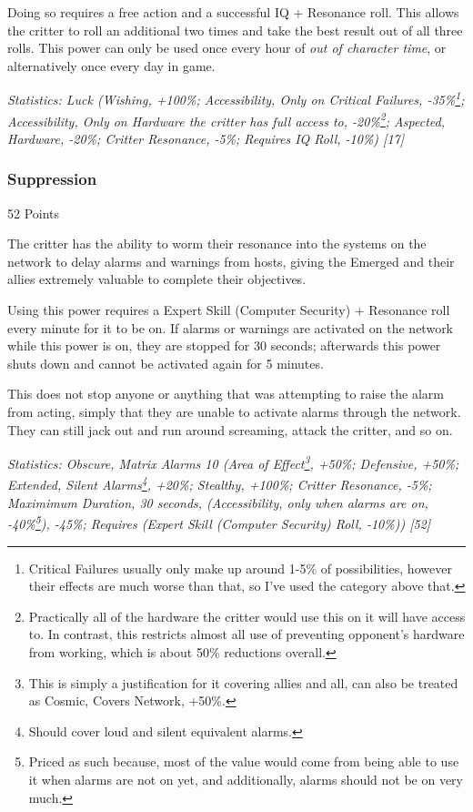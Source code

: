 \begin{multicols*}{3}
	Doing so requires a free action and a successful IQ + Resonance roll. This allows the critter to roll an additional two times and take the best result out of all three rolls. This power can only be used once every hour of \textit{out of character time}, or alternatively once every day in game.

	\textcolor{OliveGreen}{\textit{Statistics: Luck (Wishing, +100\%; Accessibility, Only on Critical Failures, -35\%\footnote{Critical Failures usually only make up around 1-5\% of possibilities, however their effects are much worse than that, so I've used the category above that.}; Accessibility, Only on Hardware the critter has full access to, -20\%\footnote{Practically all of the hardware the critter would use this on it will have access to. In contrast, this restricts almost all use of preventing opponent's hardware from working, which is about 50\% reductions overall.}; Aspected, Hardware, -20\%; Critter Resonance, -5\%; Requires IQ Roll, -10\%) [17] }}

	\subsubsection{Suppression}\label{suppression}
	\begin{flushright}
		52 Points
	\end{flushright}

	The critter has the ability to worm their resonance into the systems on the network to delay alarms and warnings from hosts, giving the Emerged and their allies extremely valuable to complete their objectives.
	
	Using this power requires a Expert Skill (Computer Security) + Resonance roll every minute for it to be on. If alarms or warnings are activated on the network while this power is on, they are stopped for 30 seconds; afterwards this power shuts down and cannot be activated again for 5 minutes.
	
	This does not stop anyone or anything that was attempting to raise the alarm from acting, simply that they are unable to activate alarms through the network. They can still jack out and run around screaming, attack the critter, and so on.

	\textcolor{OliveGreen}{\textit{Statistics: Obscure, Matrix Alarms 10 (Area of Effect\footnote{This is simply a justification for it covering allies and all, can also be treated as Cosmic, Covers Network, +50\%.}, +50\%; Defensive, +50\%; Extended, Silent Alarms\footnote{Should cover loud and silent equivalent alarms.}, +20\%; Stealthy, +100\%; Critter Resonance, -5\%; Maximimum Duration, 30 seconds, (Accessibility, only when alarms are on, -40\%\footnote{Priced as such because, most of the value would come from being able to use it when alarms are not on yet, and additionally, alarms should not be on very much.}), -45\%; Requires (Expert Skill (Computer Security) Roll, -10\%)) [52] }}


\end{multicols*}

